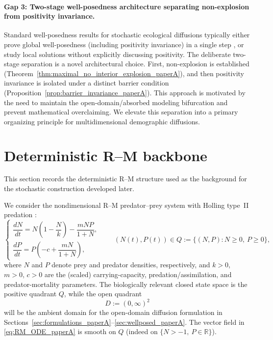\documentclass[pdflatex,sn-mathphys-ay]{sn-jnl}
\theoremstyle{thmstyleone}
\theoremstyle{definition}
\theoremstyle{remark}
\begin{document}
\paragraph{Gap 3: Two-stage well-posedness architecture separating non-explosion from positivity invariance.}
Standard well-posedness results for stochastic ecological diffusions typically either prove global well-posedness (including positivity invariance) in a single step  \citep{cui_long-term_2026,zhao_stochastic_2024,zhan_dynamical_2024,liu_asymptotic_2020}, or study local solutions without explicitly discussing positivity. 
The deliberate two-stage separation is a novel architectural choice.
First, non-explosion is established (Theorem~\ref{thm:maximal_no_interior_explosion_paperA}), 
and then positivity invariance is isolated under a distinct barrier condition (Proposition~\ref{prop:barrier_invariance_paperA}).
This approach is motivated by the need to maintain the open-domain/absorbed modeling bifurcation and prevent mathematical overclaiming. 
We elevate this separation into a primary organizing principle for multidimensional demographic diffusions.

\section{Deterministic R--M backbone}
\label{sec:deterministic_backbone}

This section records the deterministic R--M structure used as the background for the stochastic construction developed later. 

We consider the nondimensional R--M predator--prey system with Holling type~II predation \citep{grunert_evolutionarily_2021}:
\begin{equation}
\label{eq:RM_ODE_paperA}
\begin{cases}
\dfrac{dN}{dt} = N\!\left(1-\dfrac{N}{k}\right) - \dfrac{mNP}{1+N}, \\[8pt]
\dfrac{dP}{dt} = P\!\left(-c + \dfrac{mN}{1+N}\right),
\end{cases}
\qquad (N(t),P(t))\in Q:=\{(N,P):N\ge 0,\ P\ge 0\},
\end{equation}
where \(N\) and \(P\) denote prey and predator densities, respectively, and \(k>0\), \(m>0\), \(c>0\) are the (scaled) carrying-capacity, predation/assimilation, and predator-mortality parameters. The biologically relevant closed state space is the positive quadrant \(Q\), while the open quadrant
\begin{equation}
\label{eq:positive_quadrant_paperA}
D:=(0,\infty)^2
\end{equation}
will be the ambient domain for the open-domain diffusion formulation in Sections~\ref{sec:formulations_paperA}--\ref{sec:wellposed_paperA}. The vector field in \eqref{eq:RM_ODE_paperA} is smooth on \(Q\) (indeed on \(\{N>-1,\ P\in \mathbb R\}\)).
\end{document}
